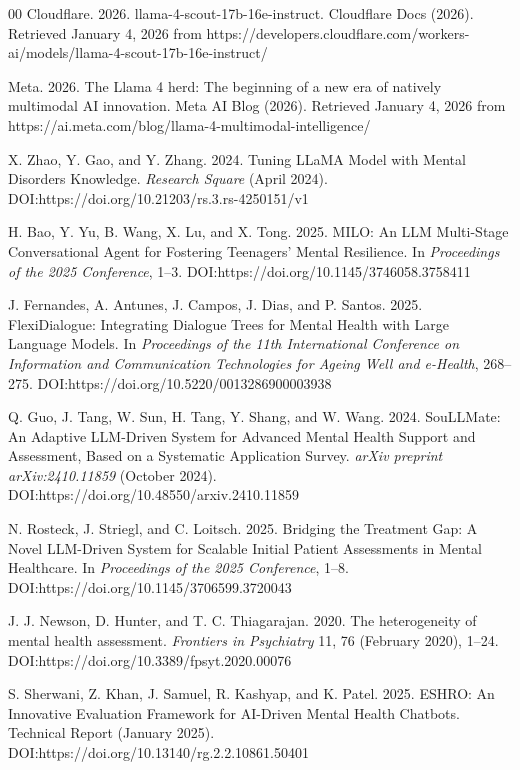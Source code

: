 ﻿\documentclass[acmsmall,screen]{acmart}
\begin{document}
\begin{thebibliography}{00}
 Cloudflare. 2026. llama-4-scout-17b-16e-instruct. Cloudflare Docs (2026). Retrieved January 4, 2026 from https://developers.cloudflare.com/workers-ai/models/llama-4-scout-17b-16e-instruct/ 

 Meta. 2026. The Llama 4 herd: The beginning of a new era of natively multimodal AI innovation. Meta AI Blog (2026). Retrieved January 4, 2026 from https://ai.meta.com/blog/llama-4-multimodal-intelligence/

 X. Zhao, Y. Gao, and Y. Zhang. 2024. Tuning LLaMA Model with Mental Disorders Knowledge. \textit{Research Square} (April 2024). DOI:https://doi.org/10.21203/rs.3.rs-4250151/v1

 H. Bao, Y. Yu, B. Wang, X. Lu, and X. Tong. 2025. MILO: An LLM Multi-Stage Conversational Agent for Fostering Teenagers' Mental Resilience. In \textit{Proceedings of the 2025 Conference}, 1--3. DOI:https://doi.org/10.1145/3746058.3758411

 J. Fernandes, A. Antunes, J. Campos, J. Dias, and P. Santos. 2025. FlexiDialogue: Integrating Dialogue Trees for Mental Health with Large Language Models. In \textit{Proceedings of the 11th International Conference on Information and Communication Technologies for Ageing Well and e-Health}, 268--275. DOI:https://doi.org/10.5220/0013286900003938

 Q. Guo, J. Tang, W. Sun, H. Tang, Y. Shang, and W. Wang. 2024. SouLLMate: An Adaptive LLM-Driven System for Advanced Mental Health Support and Assessment, Based on a Systematic Application Survey. \textit{arXiv preprint arXiv:2410.11859} (October 2024). DOI:https://doi.org/10.48550/arxiv.2410.11859

 N. Rosteck, J. Striegl, and C. Loitsch. 2025. Bridging the Treatment Gap: A Novel LLM-Driven System for Scalable Initial Patient Assessments in Mental Healthcare. In \textit{Proceedings of the 2025 Conference}, 1--8. DOI:https://doi.org/10.1145/3706599.3720043

 J. J. Newson, D. Hunter, and T. C. Thiagarajan. 2020. The heterogeneity of mental health assessment. \textit{Frontiers in Psychiatry} 11, 76 (February 2020), 1--24. DOI:https://doi.org/10.3389/fpsyt.2020.00076

 S. Sherwani, Z. Khan, J. Samuel, R. Kashyap, and K. Patel. 2025. ESHRO: An Innovative Evaluation Framework for AI-Driven Mental Health Chatbots. Technical Report (January 2025). DOI:https://doi.org/10.13140/rg.2.2.10861.50401


\end{thebibliography}
\end{document}
